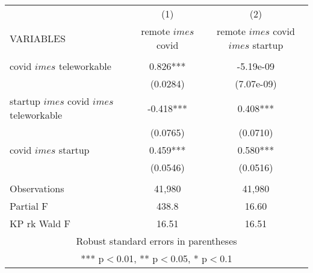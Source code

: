 \begin{tabular}{lcc} \hline
 & (1) & (2) \\
VARIABLES & remote $	imes$ covid & remote $	imes$ covid $	imes$ startup \\ \hline
 &  &  \\
covid $	imes$ teleworkable & 0.826*** & -5.19e-09 \\
 & (0.0284) & (7.07e-09) \\
startup $	imes$ covid $	imes$ teleworkable & -0.418*** & 0.408*** \\
 & (0.0765) & (0.0710) \\
covid $	imes$ startup & 0.459*** & 0.580*** \\
 & (0.0546) & (0.0516) \\
 &  &  \\
Observations & 41,980 & 41,980 \\
Partial F & 438.8 & 16.60 \\
 KP rk Wald F & 16.51 & 16.51 \\ \hline
\multicolumn{3}{c}{ Robust standard errors in parentheses} \\
\multicolumn{3}{c}{ *** p$<$0.01, ** p$<$0.05, * p$<$0.1} \\
\end{tabular}
